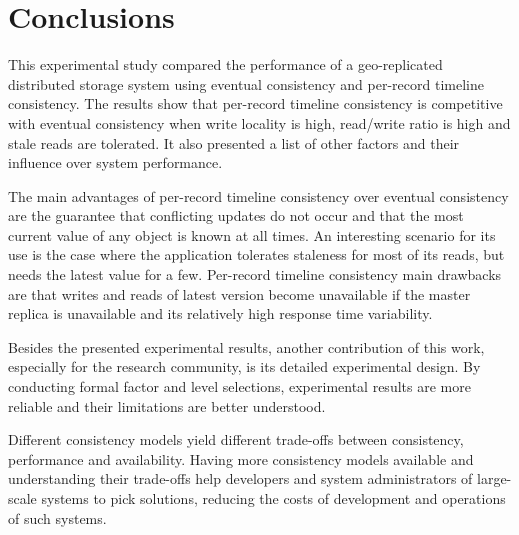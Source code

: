 \documentclass[man,floatsintext,12pt]{apa6}
\begin{document}
\section{Conclusions}

This experimental study compared the performance of a geo-replicated
distributed storage system using eventual consistency and per-record timeline
consistency. The results show that per-record timeline consistency is
competitive with eventual consistency when write locality is high, read/write
ratio is high and stale reads are tolerated. It also presented a list of other
factors and their influence over system performance.

The main advantages of per-record timeline consistency over eventual
consistency are the guarantee that conflicting updates do not occur and that
the most current value of any object is known at all times. An interesting
scenario for its use is the case where the application tolerates staleness for
most of its reads, but needs the latest value for a few. Per-record
timeline consistency main drawbacks are that writes and reads of latest version
become unavailable if the master replica is unavailable and its relatively high
response time variability.

Besides the presented experimental results, another contribution of this work,
especially for the research community, is its detailed experimental design. By
conducting formal factor and level selections, experimental results are more
reliable and their limitations are better understood.

Different consistency models yield different trade-offs between consistency,
performance and availability. Having more consistency models available and
understanding their trade-offs help developers and system administrators of
large-scale systems to pick solutions, reducing the costs of development and
operations of such systems.

%
%
\printbibliography
\end{document}
